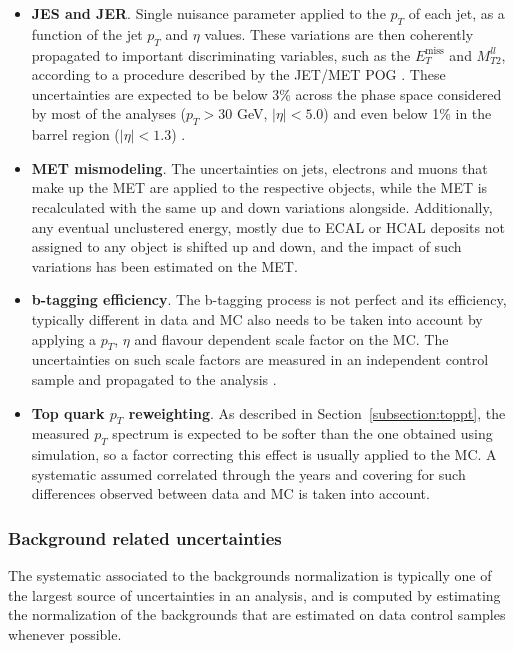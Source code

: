 \documentclass[a4paper, 10pt, openright]{report}
\begin{document}
\begin{itemize}
\item \textbf{\ac{JES} and \ac{JER}}. Single nuisance parameter applied to the $p_T$ of each jet, as a function of the jet $p_T$ and $\eta$ values. These variations are then coherently propagated to important discriminating variables, such as the $E_T^\text{miss}$ and $M_{T2}^{ll}$, according to a procedure described by the JET/MET \ac{POG} \cite{JETMETPOG}. These uncertainties are expected to be below 3\% across the phase space considered by most of the analyses ($p_T > 30$ GeV, $|\eta| < 5.0$) and even below 1\% in the barrel region ($|\eta| < 1.3$) \cite{JESUncertainty}.
\item \textbf{\ac{MET} mismodeling}. The uncertainties on jets, electrons and muons that make up the \ac{MET} are applied to the respective objects, while the \ac{MET} is recalculated with the same up  and down variations alongside. Additionally, any eventual unclustered energy, mostly due to \ac{ECAL} or \ac{HCAL} deposits not assigned to any object is shifted up and down, and the impact of such variations has been estimated on the \ac{MET}.
\item \textbf{b-tagging efficiency}. The b-tagging process is not perfect and its efficiency, typically different in data and \ac{MC} also needs to be taken into account by applying a $p_T$, $\eta$ and flavour dependent scale factor on the \ac{MC}. The uncertainties on such scale factors are measured in an independent control sample and propagated to the analysis \cite{btagEff}.
\item \textbf{Top quark $p_T$ reweighting}. As described in Section~\ref{subsection:toppt}, the measured $p_T$ spectrum is expected to be softer than the one obtained using simulation, so a factor correcting this effect is usually applied to the \ac{MC}. A systematic assumed correlated through the years and covering for such differences observed between data and \ac{MC} is taken into account.
\end{itemize}

\subsubsection{Background related uncertainties}

The systematic associated to the backgrounds normalization is typically one of the largest source of uncertainties in an analysis, and is computed by estimating the normalization of the backgrounds that are estimated on data control samples whenever possible. 
\end{document}

